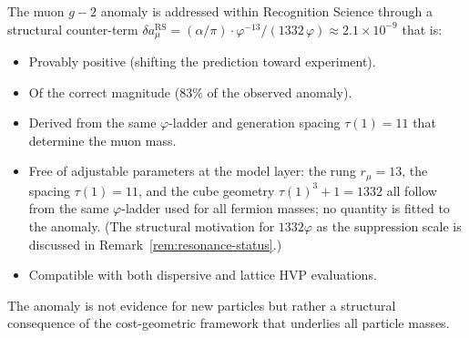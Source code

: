 \documentclass[12pt,a4paper]{article}
\theoremstyle{definition}
\theoremstyle{remark}
\begin{document}
The muon $g-2$ anomaly is addressed within Recognition Science through a
structural counter-term
$\delta a_\mu^{\mathrm{RS}} = (\alpha/\pi) \cdot \varphi^{-13} /
(1332\,\varphi) \approx 2.1 \times 10^{-9}$ that is:
\begin{itemize}
  \item Provably positive (shifting the prediction toward experiment).
  \item Of the correct magnitude ($83\%$ of the observed anomaly).
  \item Derived from the same $\varphi$-ladder and generation spacing
  $\tau(1) = 11$ that determine the muon mass.
  \item Free of adjustable parameters at the model layer: the rung $r_\mu = 13$,
  the spacing $\tau(1) = 11$, and the cube geometry $\tau(1)^3 + 1 = 1332$
  all follow from the same $\varphi$-ladder used for all fermion masses;
  no quantity is fitted to the anomaly.  (The structural motivation for
  $1332\varphi$ as the suppression scale is discussed in
  Remark~\ref{rem:resonance-status}.)
  \item Compatible with both dispersive and lattice HVP evaluations.
\end{itemize}

The anomaly is not evidence for new particles but rather a structural
consequence of the cost-geometric framework that underlies all particle
masses.
\end{document}

